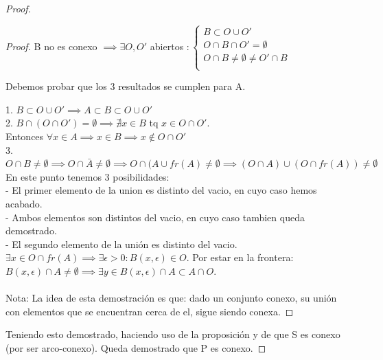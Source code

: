 \begin{ejer}
\begin{proof}
\begin{proof}
B no es conexo $\implies \exists O,O'$ abiertos $: \begin{cases}
B \subset O\cup O'\\
O \cap B \cap O' = \emptyset\\
O \cap B \neq \emptyset \neq O' \cap B\\
\end{cases}$

 Debemos probar que los 3 resultados se cumplen para A.

 1. $B \subset O \cup O' \implies A \subset B \subset O \cup O'$\\
 2. $B \cap (O\cap O') = \emptyset \implies \nexists x \in B$ tq $x \in O \cap O'$. \\
 Entonces $\forall x \in A \implies x \in B \implies x \not\in O \cap O'$\\
 3. $O \cap B \neq \emptyset \implies O\cap \bar{A} \neq \emptyset \implies O\cap (A\cup fr(A) \neq \emptyset \implies (O\cap A)\cup (O\cap fr(A)) \neq \emptyset$
 En este punto tenemos 3 posibilidades:\\
  - El primer elemento de la union es distinto del vacio, en cuyo caso hemos acabado.\\
  - Ambos elementos son distintos del vacio, en cuyo caso tambien queda demostrado.\\
  - El segundo elemento de la unión es distinto del vacio. $\exists x \in O\cap fr(A) \implies \exists \epsilon > 0 : B(x,\epsilon) \in O$. Por estar en la frontera: $B(x,\epsilon)\cap A \neq \emptyset \implies \exists y \in B(x,\epsilon)\cap A \subset A \cap O$.\\\\

  Nota: La idea de esta demostración es que: dado un conjunto conexo, su unión con elementos que se encuentran cerca de el, sigue siendo conexa.

\end{proof}

Teniendo esto demostrado, haciendo uso de la proposición y de que S es conexo (por ser arco-conexo). Queda demostrado que P es conexo.

\end{proof}

\end{ejer}


